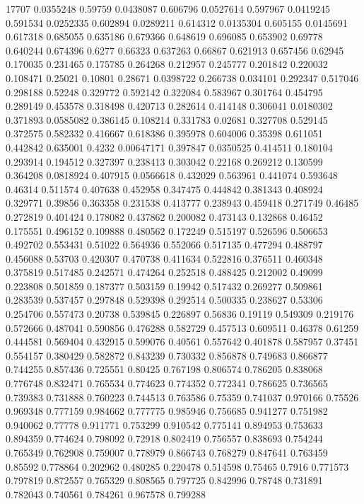 17707
0.0355248 0.59759
0.0438087 0.606796
0.0527614 0.597967
0.0419245 0.591534
0.0252335 0.602894
0.0289211 0.614312
0.0135304 0.605155
0.0145691 0.617318
0.685055 0.635186
0.679366 0.648619
0.696085 0.653902
0.69778 0.640244
0.674396 0.6277
0.66323 0.637263
0.66867 0.621913
0.657456 0.62945
0.170035 0.231465
0.175785 0.264268
0.212957 0.245777
0.201842 0.220032
0.108471 0.25021
0.10801 0.28671
0.0398722 0.266738
0.034101 0.292347
0.517046 0.298188
0.52248 0.329772
0.592142 0.322084
0.583967 0.301764
0.454795 0.289149
0.453578 0.318498
0.420713 0.282614
0.414148 0.306041
0.0180302 0.371893
0.0585082 0.386145
0.108214 0.331783
0.02681 0.327708
0.529145 0.372575
0.582332 0.416667
0.618386 0.395978
0.604006 0.35398
0.611051 0.442842
0.635001 0.4232
0.00647171 0.397847
0.0350525 0.414511
0.180104 0.293914
0.194512 0.327397
0.238413 0.303042
0.22168 0.269212
0.130599 0.364208
0.0818924 0.407915
0.0566618 0.432029
0.563961 0.441074
0.593648 0.46314
0.511574 0.407638
0.452958 0.347475
0.444842 0.381343
0.408924 0.329771
0.39856 0.363358
0.231538 0.413777
0.238943 0.459418
0.271749 0.46485
0.272819 0.401424
0.178082 0.437862
0.200082 0.473143
0.132868 0.46452
0.175551 0.496152
0.109888 0.480562
0.172249 0.515197
0.526596 0.506653
0.492702 0.553431
0.51022 0.564936
0.552066 0.517135
0.477294 0.488797
0.456088 0.53703
0.420307 0.470738
0.411634 0.522816
0.376511 0.460348
0.375819 0.517485
0.242571 0.474264
0.252518 0.488425
0.212002 0.49099
0.223808 0.501859
0.187377 0.503159
0.19942 0.517432
0.269277 0.509861
0.283539 0.537457
0.297848 0.529398
0.292514 0.500335
0.238627 0.53306
0.254706 0.557473
0.20738 0.539845
0.226897 0.56836
0.19119 0.549309
0.219176 0.572666
0.487041 0.590856
0.476288 0.582729
0.457513 0.609511
0.46378 0.61259
0.444581 0.569404
0.432915 0.599076
0.40561 0.557642
0.401878 0.587957
0.37451 0.554157
0.380429 0.582872
0.843239 0.730332
0.856878 0.749683
0.866877 0.744255
0.857436 0.725551
0.80425 0.767198
0.806574 0.786205
0.838068 0.776748
0.832471 0.765534
0.774623 0.774352
0.772341 0.786625
0.736565 0.739383
0.731888 0.760223
0.744513 0.763586
0.75359 0.741037
0.970166 0.75526
0.969348 0.777159
0.984662 0.777775
0.985946 0.756685
0.941277 0.751982
0.940062 0.77778
0.911771 0.753299
0.910542 0.775141
0.894953 0.753633
0.894359 0.774624
0.798092 0.72918
0.802419 0.756557
0.838693 0.754244
0.765349 0.762908
0.759007 0.778979
0.866743 0.768279
0.847641 0.763459
0.85592 0.778864
0.202962 0.480285
0.220478 0.514598
0.75465 0.7916
0.771573 0.797819
0.872557 0.765329
0.808565 0.797725
0.842996 0.78748
0.731891 0.782043
0.740561 0.784261
0.967578 0.799288
